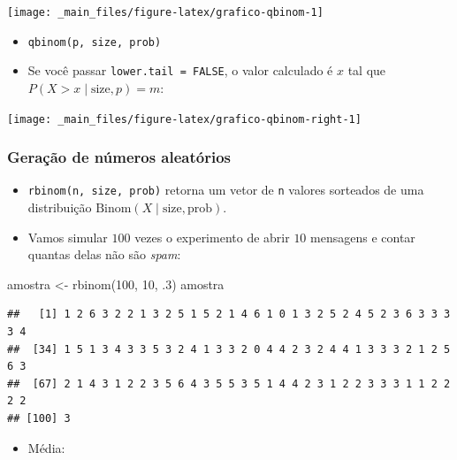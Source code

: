 \documentclass[
  11pt]{report}
\newenvironment{Shaded}{\begin{snugshade}}{\end{snugshade}}
\newcommand{\DecValTok}[1]{\textcolor[rgb]{0.00,0.00,0.81}{#1}}
\newcommand{\FunctionTok}[1]{\textcolor[rgb]{0.00,0.00,0.00}{#1}}
\newcommand{\NormalTok}[1]{#1}
\newcommand{\OtherTok}[1]{\textcolor[rgb]{0.56,0.35,0.01}{#1}}
\providecommand{\tightlist}{%
  \setlength{\itemsep}{0pt}\setlength{\parskip}{0pt}}
\renewenvironment{Shaded}{
    \begin{mdframed}[%
      roundcorner=2pt,%
      innerleftmargin=5pt,%
      innerrightmargin=5pt,%
      topline=true,%
      leftline=true,%
      rightline=true,%
      bottomline=true,%
      linewidth=0.5pt,%
      linecolor=black!20,%
      backgroundcolor=black!2,%
      skipabove=2ex,%
      skipbelow=2.5ex%
    ]%
  }
  {
    \end{mdframed}
  }
\begin{document}
\begin{center}\texttt{[image: \_main\_files/figure-latex/grafico-qbinom-1]} \end{center}

\begin{itemize}
\item
  \texttt{qbinom(p,\ size,\ prob)}
\item
  Se você passar \texttt{lower.tail\ =\ FALSE}, o valor calculado é $x$ tal que $P(X > x \mid \text{size}, p) = m$:
\end{itemize}

\begin{center}\texttt{[image: \_main\_files/figure-latex/grafico-qbinom-right-1]} \end{center}

\hypertarget{gerauxe7uxe3o-de-nuxfameros-aleatuxf3rios}{%
\subsubsection*{Geração de números aleatórios}\label{gerauxe7uxe3o-de-nuxfameros-aleatuxf3rios}}

\begin{itemize}
\item
  \texttt{rbinom(n,\ size,\ prob)} retorna um vetor de \texttt{n} valores sorteados de uma distribuição $\text{Binom}(X \mid \text{size}, \text{prob})$.
\item
  Vamos simular $100$ vezes o experimento de abrir $10$ mensagens e contar quantas delas não são \emph{spam}:
\end{itemize}

\begin{Shaded}
\begin{Highlighting}[]
\NormalTok{amostra }\OtherTok{\textless{}{-}} \FunctionTok{rbinom}\NormalTok{(}\DecValTok{100}\NormalTok{, }\DecValTok{10}\NormalTok{, .}\DecValTok{3}\NormalTok{)}
\NormalTok{amostra}
\end{Highlighting}
\end{Shaded}

\begin{verbatim}
##   [1] 1 2 6 3 2 2 1 3 2 5 1 5 2 1 4 6 1 0 1 3 2 5 2 4 5 2 3 6 3 3 3 3 4
##  [34] 1 5 1 3 4 3 3 5 3 2 4 1 3 3 2 0 4 4 2 3 2 4 4 1 3 3 3 2 1 2 5 6 3
##  [67] 2 1 4 3 1 2 2 3 5 6 4 3 5 5 3 5 1 4 4 2 3 1 2 2 3 3 3 1 1 2 2 2 2
## [100] 3
\end{verbatim}

\begin{itemize}
\tightlist
\item
  Média:
\end{itemize}
\end{document}
